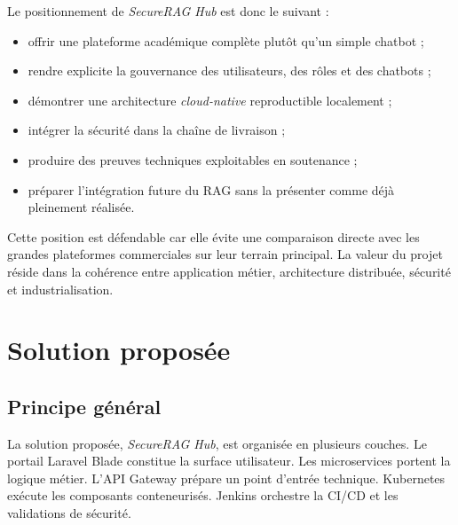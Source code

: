 Le positionnement de \textit{SecureRAG Hub} est donc le suivant :

\begin{itemize}
    \item offrir une plateforme académique complète plutôt qu'un simple chatbot ;
    \item rendre explicite la gouvernance des utilisateurs, des rôles et des chatbots ;
    \item démontrer une architecture \textit{cloud-native} reproductible localement ;
    \item intégrer la sécurité dans la chaîne de livraison ;
    \item produire des preuves techniques exploitables en soutenance ;
    \item préparer l'intégration future du RAG sans la présenter comme déjà pleinement réalisée.
\end{itemize}

Cette position est défendable car elle évite une comparaison directe avec les grandes plateformes commerciales sur leur terrain principal. La valeur du projet réside dans la cohérence entre application métier, architecture distribuée, sécurité et industrialisation.

\section{Solution proposée}

\subsection{Principe général}

La solution proposée, \textit{SecureRAG Hub}, est organisée en plusieurs couches. Le portail Laravel Blade constitue la surface utilisateur. Les microservices portent la logique métier. L'API Gateway prépare un point d'entrée technique. Kubernetes exécute les composants conteneurisés. Jenkins orchestre la CI/CD et les validations de sécurité.

